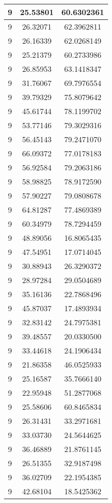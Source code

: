 \documentclass[
]{book}
\begin{document}
\begin{tabular}{c|c|c}
\hline
9 & 25.53801 & 60.6302361\\
\hline
9 & 26.32071 & 62.3962811\\
\hline
9 & 26.16339 & 62.0268149\\
\hline
9 & 25.21379 & 60.2733986\\
\hline
9 & 26.85953 & 63.1418347\\
\hline
9 & 31.76067 & 69.7976554\\
\hline
9 & 39.79329 & 75.8079642\\
\hline
9 & 45.61744 & 78.1199702\\
\hline
9 & 53.77146 & 79.3029316\\
\hline
9 & 56.45143 & 79.2471070\\
\hline
9 & 66.09372 & 77.0178183\\
\hline
9 & 56.92584 & 79.2063186\\
\hline
9 & 58.98825 & 78.9172590\\
\hline
9 & 57.90227 & 79.0808678\\
\hline
9 & 64.81287 & 77.4869389\\
\hline
9 & 60.34979 & 78.7294459\\
\hline
9 & 48.89056 & 16.8065435\\
\hline
9 & 47.54951 & 17.0714045\\
\hline
9 & 30.88943 & 26.3290372\\
\hline
9 & 28.97284 & 29.0504689\\
\hline
9 & 35.16136 & 22.7868496\\
\hline
9 & 45.87037 & 17.4893934\\
\hline
9 & 32.83142 & 24.7975381\\
\hline
9 & 39.48557 & 20.0330500\\
\hline
9 & 33.44618 & 24.1906434\\
\hline
9 & 21.86358 & 46.0525933\\
\hline
9 & 25.16587 & 35.7666140\\
\hline
9 & 22.95948 & 51.2877068\\
\hline
9 & 25.58606 & 60.8465834\\
\hline
9 & 26.31431 & 33.2971681\\
\hline
9 & 33.03730 & 24.5644625\\
\hline
9 & 36.46889 & 21.8761145\\
\hline
9 & 26.51355 & 32.9187498\\
\hline
9 & 36.02709 & 22.1954385\\
\hline
9 & 42.68104 & 18.5425362\\

\end{tabular}
\end{document}
